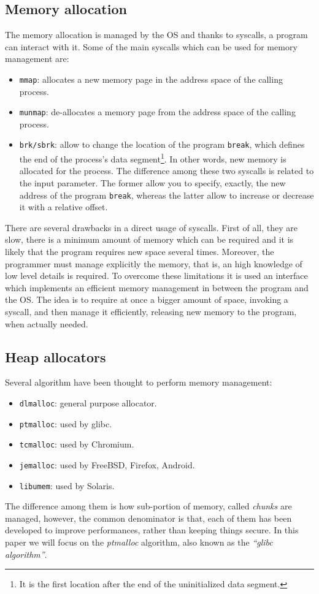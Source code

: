 \documentclass{article}
\numberwithin{equation}{subsection}
\begin{document}
\subsection{Memory allocation}
The memory allocation is managed by the OS and thanks to syscalls, a program can interact with it. Some of the main syscalls which can be used for memory management are:
\begin{itemize}
    \item \texttt{mmap}: allocates a new memory page in the address space of the calling process.
    \item \texttt{munmap}: de-allocates a memory page from the address space of the calling process.
    \item \texttt{brk/sbrk}: allow to change the location of the program \texttt{break}, which defines the end of the process's data segment\footnote{It is the first location after the end of the uninitialized data segment.}. In other words, new memory is allocated for the process. The difference among these two syscalls is related to the input parameter. The former allow you to specify, exactly, the new address of the program \texttt{break}, whereas the latter allow to increase or decrease it with a relative offset.
\end{itemize}
There are several drawbacks in a direct usage of syscalls. First of all, they are slow, there is a minimum amount of memory which can be required and it is likely that the program requires new space several times. Moreover, the programmer must manage explicitly the memory, that is, an high knowledge of low level details is required. To overcome these limitations it is used an interface which implements an efficient memory management in between the program and the OS. The idea is to require at once a bigger amount of space, invoking a syscall, and then manage it efficiently, releasing new memory to the program, when actually
needed.
\subsection{Heap allocators}
Several algorithm have been thought to perform memory management:
\begin{itemize}
    \item \texttt{dlmalloc}: general purpose allocator.
    \item \texttt{ptmalloc}: used by glibc.
    \item \texttt{tcmalloc}: used by Chromium.
    \item \texttt{jemalloc}: used by FreeBSD, Firefox, Android.
    \item \texttt{libumem}: used by Solaris.
\end{itemize}
The difference among them is how sub-portion of memory, called \emph{chunks} are managed, however, the common denominator is that, each of them has been developed to improve performances, rather than keeping things secure. In this paper we will focus on the \emph{ptmalloc} algorithm, also known as the \textit{``glibc algorithm''}.
\end{document}
